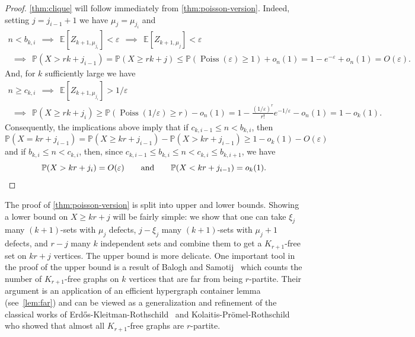 \documentclass[11pt]{article}
\theoremstyle{definition}
\theoremstyle{remark}
\renewcommand{\epsilon}{\varepsilon}
\newcommand{\Poiss}{\operatorname{Poiss}}
\newcommand{\E}{\mathbb{E}}
\newcommand{\PP}{\mathbb{P}}
\begin{document}
\begin{proof}
\cref{thm:clique} will follow immediately from \cref{thm:poisson-version}. 
Indeed, setting $j = j_{i-1} + 1 $ we have $ \mu_j =\mu_{j_{i}}$ and 
\begin{multline*} n < b_{k,i} \ \ \implies \ \ \E[ Z_{k+1, \mu_{j_{i}}}] < \epsilon
\ \ \implies \ \ \E[ Z_{k+1, \mu_{j}}] < \epsilon \\ \ \ \implies \ \ 
\PP( X >rk + j_{i-1})= \PP(X \ge rk+j) \le \PP( \Poiss( \epsilon) \ge 1) +o_n(1) = 1 - e^{-\epsilon} +o_n(1) = O( \epsilon).
\end{multline*}
And, for $k$ sufficiently large we have
\begin{multline*} n \ge c_{k,i} \ \ \implies \ \ \E[ Z_{k+1, \mu_{j_{i}}}] > 1/\epsilon \\
\ \ \implies \ \ 
\PP( X \ge rk+j_i) \ge \PP( \Poiss( 1/\epsilon) \ge r) -o_n(1) = 1 - \frac{ (1/\epsilon)^{r}}{ r!}e^{-1/\epsilon} - o_n(1) = 1 - o_k(1).
\end{multline*}
Consequently, the implications above imply that if $c_{k, i-1} \le n < b_{k,i}$, then
$$\PP(X=kr+j_{i-1}) = \PP(X\ge kr+j_{i-1}) -\PP(X>kr+j_{i-1}) \ge 
1-o_k(1)-O(\varepsilon)$$ and if $b_{k, i} \le n < c_{k,i}$, then, since $c_{k, i-1}\le b_{k, i} \le n < c_{k,i} \le b_{k, i+1}$, we have
\begin{equation*}\PP(X>kr+j_{i}) = O(\varepsilon) \qquad \hbox{and}\qquad  \PP(X<kr+j_{i-1}) = o_k(1). \qedhere \end{equation*}
\end{proof}


The proof of \cref{thm:poisson-version} is split into upper and lower bounds.  Showing a lower bound on $X \geq kr + j$ will be fairly simple: we show that one can take $\xi_j$ many $(k+1)$-sets with $\mu_{j}$ defects, $j-\xi_j$ many $(k+1)$-sets
with $ \mu_j+1$ defects, and $r - j$ many $k$ independent sets and combine them to get a $K_{r+1}$-free set on $kr + j$ vertices.  The upper bound is more delicate. 
One important tool in the proof of the upper bound is a result of Balogh  and Samotij~\cite{balogh2019efficient} which counts the number of $K_{r+1}$-free graphs on $k$ vertices that are far from being $r$-partite. Their argument is an application of an efficient hypergraph container lemma (see~\cref{lem:far}) and can be viewed as a generalization and refinement of the classical works of Erd\H{o}s-Kleitman-Rothschild~\cite{EKR} and Kolaitis-Pr\"omel-Rothschild~\cite{KPR} who showed that almost all $K_{r+1}$-free graphs are $r$-partite.  
\end{document}
